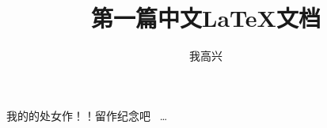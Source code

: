 \documentclass[a4paper,10pt]{article}
\title{第一篇中文\LaTeX{}文档}
\author{我高兴}
\date{}
\begin{document}
\maketitle
我的\XeLaTeX{}的处女作！！留作纪念吧~
\ldots
\end{document}
